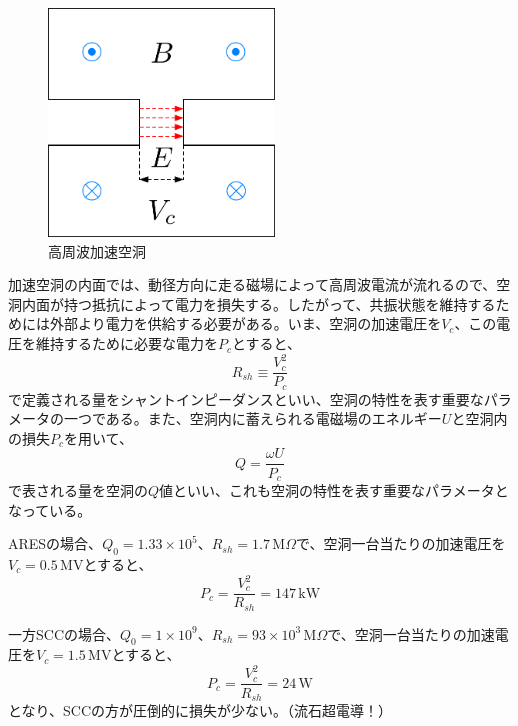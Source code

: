 \documentclass[10pt,a4paper]{ltjsarticle}
\begin{document}
\begin{figure}[hbt]
  \begin{center}
    \includegraphics[width=6cm,clip]{cavity3.pdf}
    \caption{高周波加速空洞}
   \label{cavity3}
  \end{center}
\end{figure}

加速空洞の内面では、動径方向に走る磁場によって高周波電流が流れるので、空洞内面が持つ抵抗によって電力を損失する。したがって、共振状態を維持するためには外部より電力を供給する必要がある。いま、空洞の加速電圧を$V_{c}$、この電圧を維持するために必要な電力を$P_{c}$とすると、
%
\begin{equation}
  R_{sh} \equiv \frac{V_{c}^2}{P_{c}}
  \label{sh}
\end{equation}
%
で定義される量をシャントインピーダンスといい、空洞の特性を表す重要なパラメータの一つである。また、空洞内に蓄えられる電磁場のエネルギー$U$と空洞内の損失$P_{c}$を用いて、
%
\begin{equation}
  Q = \frac{\omega U}{P_{c}}
  \label{q_val}
\end{equation}
%
で表される量を空洞の$Q$値といい、これも空洞の特性を表す重要なパラメータとなっている。

\begin{tcolorbox}[title=\textgt{ARESとSCCの空洞損失}]
  ARESの場合、$Q_{0}=1.33\times10^5$、$R_{sh}=1.7\,\mathrm{M}\Omega$で、空洞一台当たりの加速電圧を$V_{c}=0.5\,\mathrm{MV}$とすると、
%
\begin{equation*}
  P_{c} = \frac{V_{c}^2}{R_{sh}}=147\,\mathrm{kW}
\end{equation*}

一方SCCの場合、$Q_{0}=1\times10^9$、$R_{sh}=93\times 10^3\,\mathrm{M}\Omega$で、空洞一台当たりの加速電圧を$V_{c}=1.5\,\mathrm{MV}$とすると、
%
\begin{equation*}
  P_{c} = \frac{V_{c}^2}{R_{sh}}=24\,\mathrm{W}
\end{equation*}
%
となり、SCCの方が圧倒的に損失が少ない。（流石超電導！）
\end{tcolorbox}
\end{document}
